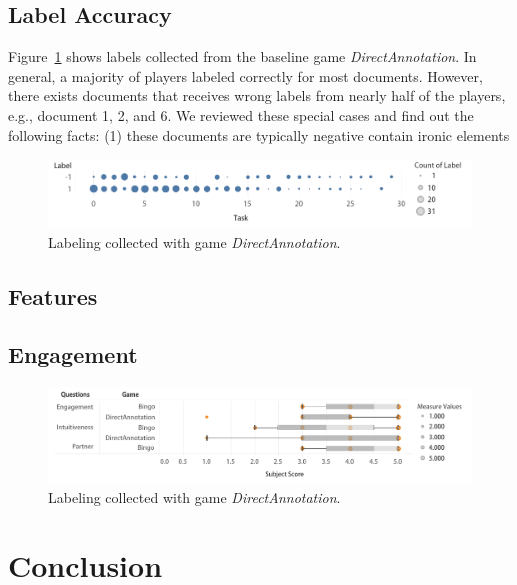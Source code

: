 \documentclass[chi_draft]{sigchi}
\begin{document}
\subsection{Label Accuracy}

Figure~\ref{fig:direct-label} shows labels collected from the baseline game \emph{DirectAnnotation}. In general, a majority of players labeled correctly for most documents. However, there exists documents that receives wrong labels from nearly half of the players, e.g., document 1, 2, and 6. We reviewed these special cases and find out the following facts: (1) these documents are typically negative contain ironic elements 

\begin{figure}[t]
\includegraphics[width=\linewidth]{figures/direct-label.pdf}
\caption{Labeling collected with game \emph{DirectAnnotation}.}
\label{fig:direct-label}
\end{figure}

\subsection{Features}

\subsection{Engagement}


\begin{figure}[t]
\includegraphics[width=\linewidth]{figures/interview.pdf}
\caption{Labeling collected with game \emph{DirectAnnotation}.}
\label{fig:interview}
\end{figure}

\section{Conclusion}
\end{document}
